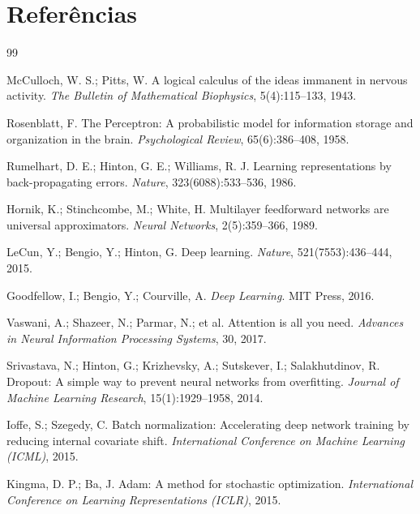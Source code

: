 \documentclass[12pt,a4paper]{article}
\begin{document}
\section{Referências}

\begin{thebibliography}{99}

McCulloch, W. S.; Pitts, W.
\newblock A logical calculus of the ideas immanent in nervous activity.
\newblock \textit{The Bulletin of Mathematical Biophysics}, 5(4):115--133, 1943.

Rosenblatt, F.
\newblock The Perceptron: A probabilistic model for information storage and organization in the brain.
\newblock \textit{Psychological Review}, 65(6):386--408, 1958.

Rumelhart, D. E.; Hinton, G. E.; Williams, R. J.
\newblock Learning representations by back-propagating errors.
\newblock \textit{Nature}, 323(6088):533--536, 1986.

Hornik, K.; Stinchcombe, M.; White, H.
\newblock Multilayer feedforward networks are universal approximators.
\newblock \textit{Neural Networks}, 2(5):359--366, 1989.

LeCun, Y.; Bengio, Y.; Hinton, G.
\newblock Deep learning.
\newblock \textit{Nature}, 521(7553):436--444, 2015.

Goodfellow, I.; Bengio, Y.; Courville, A.
\newblock \textit{Deep Learning}.
\newblock MIT Press, 2016.

Vaswani, A.; Shazeer, N.; Parmar, N.; et al.
\newblock Attention is all you need.
\newblock \textit{Advances in Neural Information Processing Systems}, 30, 2017.

Srivastava, N.; Hinton, G.; Krizhevsky, A.; Sutskever, I.; Salakhutdinov, R.
\newblock Dropout: A simple way to prevent neural networks from overfitting.
\newblock \textit{Journal of Machine Learning Research}, 15(1):1929--1958, 2014.

Ioffe, S.; Szegedy, C.
\newblock Batch normalization: Accelerating deep network training by reducing internal covariate shift.
\newblock \textit{International Conference on Machine Learning (ICML)}, 2015.

Kingma, D. P.; Ba, J.
\newblock Adam: A method for stochastic optimization.
\newblock \textit{International Conference on Learning Representations (ICLR)}, 2015.


\end{thebibliography}
\end{document}

